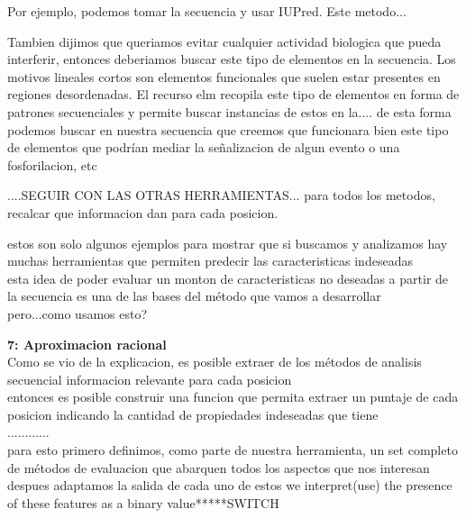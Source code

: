 \documentclass[a4paper,10pt]{article}
\begin{document}
Por ejemplo, podemos tomar la secuencia y usar IUPred. Este metodo...

Tambien dijimos que queriamos evitar cualquier actividad biologica que pueda interferir, entonces deberiamos buscar este tipo de elementos en la secuencia.
Los motivos lineales cortos son elementos funcionales que suelen estar presentes en regiones desordenadas. 
El recurso elm recopila este tipo de elementos en forma de patrones secuenciales y permite buscar instancias de estos en la....
de esta forma podemos buscar en nuestra secuencia que creemos que funcionara bien este tipo de elementos que podrían mediar la señalizacion de algun evento o una fosforilacion, etc

....SEGUIR CON LAS OTRAS HERRAMIENTAS...
para todos los metodos, recalcar que informacion dan para cada posicion.


estos son solo algunos ejemplos para mostrar que si buscamos y analizamos hay muchas herramientas que permiten predecir las caracteristicas indeseadas\\
esta idea de poder evaluar un monton de caracteristicas no deseadas a partir de la secuencia es una de las bases del método que vamos a desarrollar\\
pero...como usamos esto?



\textbf{7: Aproximacion racional}\\
Como se vio de la explicacion, es posible extraer de los métodos de analisis secuencial informacion relevante para cada posicion \\
entonces es posible construir una funcion que permita extraer un puntaje de cada posicion indicando la cantidad de propiedades indeseadas que tiene\\
............\\
para esto primero definimos, como parte de nuestra herramienta, un set completo de métodos de evaluacion que abarquen todos los aspectos que nos interesan\\
despues adaptamos la salida de cada uno de estos  we interpret(use) the presence of these features as a binary value*****SWITCH\\ 
\end{document}
